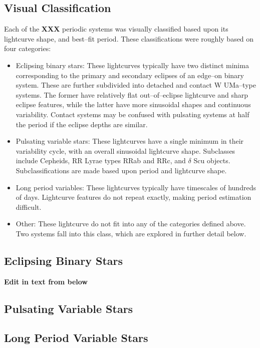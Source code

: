 \documentclass[]{emulateapj}
\begin{document}
\subsection{Visual Classification}

Each of the {\bf XXX} periodic systems was visually classified based
upon its lightcurve shape, and best--fit period.  These classifications
were roughly based on four categories:

\begin{itemize}
\item Eclipsing binary stars: These lightcurves typically have two
  distinct minima corresponding to the primary and secondary eclipses
  of an edge--on binary system.  These are further subdivided into
  detached and contact W UMa--type systems.  The former have
  relatively flat out--of--eclipse lightcurve and sharp eclipse
  features, while the latter have more sinusoidal shapes and
  continuous variability.  Contact systems may be confused with
  pulsating systems at half the period if the eclipse depths are
  similar.

\item Pulsating variable stars: These lightcurves have a single
  minimum in their variability cycle, with an overall sinusoidal
  lightcurve shape.  Subclasses include Cepheids, RR Lyrae types RRab
  and RRc, and $\delta$ Scu objects.  Subclassifications are made
  based upon period and lightcurve shape.

\item Long period variables: These lightcurves typically have
  timescales of hundreds of days.  Lightcurve features do not repeat
  exactly, making period estimation difficult.

\item Other: These lightcurve do not fit into any of the categories
  defined above.  Two systems fall into this class, which are explored
  in further detail below.

\end{itemize}

\subsection{Eclipsing Binary Stars}
{\bf Edit in text from below}
\subsection{Pulsating Variable Stars}
\subsection{Long Period Variable Stars}
\end{document}
